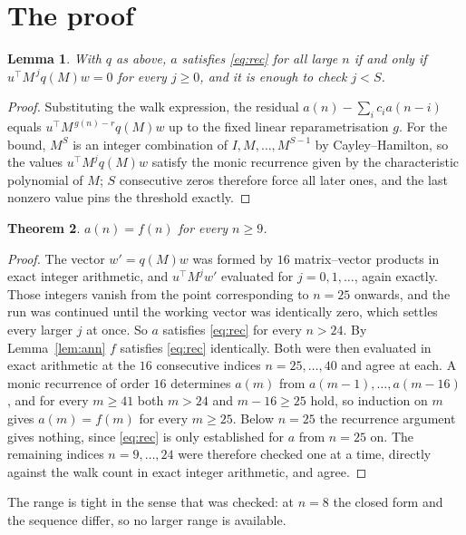 \documentclass[11pt,a4paper]{article}
\theoremstyle{plain}
\newtheorem{theorem}{Theorem}
\newtheorem{lemma}[theorem]{Lemma}
\theoremstyle{definition}
\begin{document}
\section{The proof}

\begin{lemma}\label{lem:crit}
With $q$ as above, $a$ satisfies \eqref{eq:rec} for all large $n$ if and only if
$u^{\!\top}M^{\,j}q(M)w=0$ for every $j\ge0$, and it is enough to check $j<S$.
\end{lemma}

\begin{proof}
Substituting the walk expression, the residual $a(n)-\sum_ic_ia(n-i)$ equals
$u^{\!\top}M^{\,g(n)-r}q(M)w$ up to the fixed linear reparametrisation $g$. For the bound,
$M^{S}$ is an integer combination of $I,M,\dots,M^{S-1}$ by Cayley--Hamilton, so the values
$u^{\!\top}M^{j}q(M)w$ satisfy the monic recurrence given by the characteristic polynomial of
$M$; $S$ consecutive zeros therefore force all later ones, and the last nonzero value pins the
threshold exactly.
\end{proof}

\begin{theorem}
$a(n)=f(n)$ for every $n\ge9$.
\end{theorem}

\begin{proof}
The vector $w'=q(M)w$ was formed by $16$ matrix--vector products in exact integer
arithmetic, and $u^{\!\top}M^{j}w'$ evaluated for $j=0,1,\dots$, again exactly. Those integers
vanish from the point corresponding to $n=25$ onwards, and the run was continued until the
working vector was identically zero, which settles every larger $j$ at once. So $a$ satisfies
\eqref{eq:rec} for every $n>24$. By Lemma~\ref{lem:ann} $f$ satisfies \eqref{eq:rec}
identically. Both were then evaluated in exact arithmetic at the $16$ consecutive indices
$n=25,\dots,40$ and agree at each. A monic recurrence of order $16$
determines $a(m)$ from $a(m-1),\dots,a(m-16)$, and for every $m\ge41$ both
$m>24$ and $m-16\ge25$ hold, so induction on $m$ gives $a(m)=f(m)$ for every
$m\ge25$.
Below $n=25$ the recurrence argument gives nothing, since \eqref{eq:rec} is only
established for $a$ from $n=25$ on. The remaining indices $n=9,\dots,24$ were
therefore checked one at a time, directly against the walk count in exact integer arithmetic,
and agree.
\end{proof}

The range is tight in the sense that was checked: at $n=8$ the closed form and the sequence differ, so no larger range is available.
\end{document}
